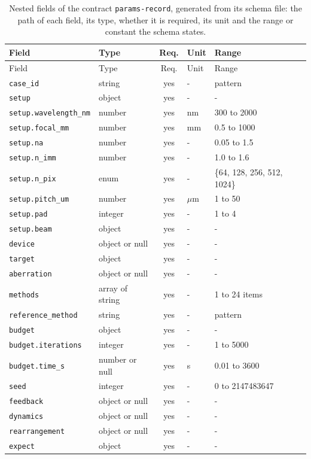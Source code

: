 \begingroup\scriptsize
\begin{longtable}{@{}l l c l l@{}}
\caption{Nested fields of the contract \texttt{params-record}, generated from its schema file: the path of each field, its type, whether it is required, its unit and the range or constant the schema states.}\label{tab:fields-params-record}\\
\toprule Field & Type & Req. & Unit & Range\\\midrule\endfirsthead
\toprule Field & Type & Req. & Unit & Range\\\midrule\endhead
\texttt{case\_id} & string & yes & - & pattern\\
\texttt{setup} & object & yes & - & -\\
\texttt{setup.wavelength\_nm} & number & yes & nm & 300 to 2000\\
\texttt{setup.focal\_mm} & number & yes & mm & 0.5 to 1000\\
\texttt{setup.na} & number & yes & - & 0.05 to 1.5\\
\texttt{setup.n\_imm} & number & yes & - & 1.0 to 1.6\\
\texttt{setup.n\_pix} & enum & yes & - & \{64, 128, 256, 512, 1024\}\\
\texttt{setup.pitch\_um} & number & yes & $\mu$m & 1 to 50\\
\texttt{setup.pad} & integer & yes & - & 1 to 4\\
\texttt{setup.beam} & object & yes & - & -\\
\texttt{device} & object or null & yes & - & -\\
\texttt{target} & object & yes & - & -\\
\texttt{aberration} & object or null & yes & - & -\\
\texttt{methods} & array of string & yes & - & 1 to 24 items\\
\texttt{reference\_method} & string & yes & - & pattern\\
\texttt{budget} & object & yes & - & -\\
\texttt{budget.iterations} & integer & yes & - & 1 to 5000\\
\texttt{budget.time\_s} & number or null & yes & s & 0.01 to 3600\\
\texttt{seed} & integer & yes & - & 0 to 2147483647\\
\texttt{feedback} & object or null & yes & - & -\\
\texttt{dynamics} & object or null & yes & - & -\\
\texttt{rearrangement} & object or null & yes & - & -\\
\texttt{expect} & object & yes & - & -\\
\bottomrule\end{longtable}
\endgroup

